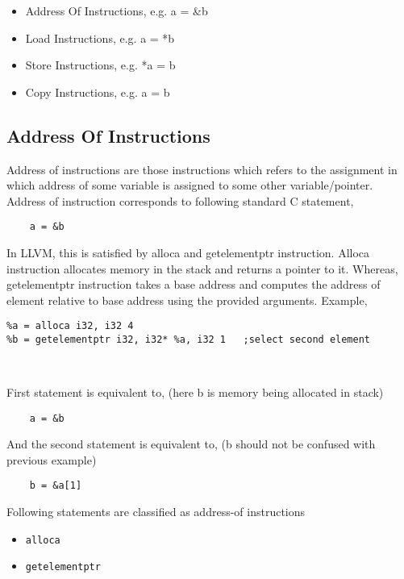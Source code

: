 \documentclass[a4paper,11pt]{report}
\begin{document}
\begin{itemize}
    \item Address Of Instructions, e.g. a = \&b
    \item Load Instructions, e.g.  a = *b
    \item Store Instructions, e.g. *a = b
    \item Copy Instructions, e.g. a = b
\end{itemize}

\subsection{Address Of Instructions}
Address of instructions are those instructions which refers to the assignment 
in which address of some variable is assigned to some other variable/pointer.
Address of instruction corresponds to following standard C statement,
    
\begin{lstlisting}
    a = &b
\end{lstlisting}

In LLVM, this is satisfied by alloca and getelementptr instruction.
Alloca instruction allocates memory in the stack and returns a pointer to it.
Whereas, getelementptr instruction takes a base address and computes the address
of element relative to base address using the provided arguments.
Example,

\begin{lstlisting}
%a = alloca i32, i32 4
%b = getelementptr i32, i32* %a, i32 1   ;select second element                 
 
                       
\end{lstlisting}

\noindent
First statement is equivalent to, (here b is memory being allocated in stack)

\begin{lstlisting}
    a = &b
\end{lstlisting}

\noindent
And the second statement is equivalent to, (b should not be confused with 
previous example)
\begin{lstlisting}
    b = &a[1]
\end{lstlisting}

\noindent
Following statements are classified as address-of instructions
\begin{itemize}
    \item \texttt{alloca}
    \item \texttt{getelementptr}
\end{itemize}
\end{document}
